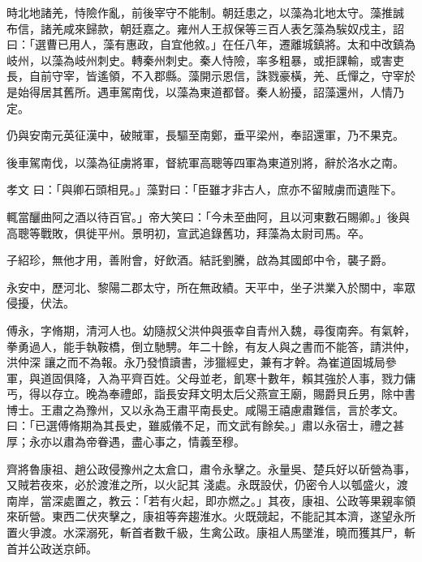 \begin{pinyinscope}
 時北地諸羌，恃險作亂，前後宰守不能制。朝廷患之，以藻為北地太守。藻推誠
 布信，諸羌咸來歸款，朝廷嘉之。雍州人王叔保等三百人表乞藻為騃奴戍主，詔曰：「選曹已用人，藻有惠政，自宜他敘。」在任八年，遷離城鎮將。太和中改鎮為岐州，以藻為岐州刺史。轉秦州刺史。秦人恃險，率多粗暴，或拒課輸，或害吏長，自前守宰，皆遙領，不入郡縣。藻開示恩信，誅戮豪橫，羌、氐憚之，守宰於是始得居其舊所。遇車駕南伐，以藻為東道都督。秦人紛擾，詔藻還州，人情乃定。



 仍與安南元英征漢中，破賊軍，長驅至南鄭，垂平梁州，奉詔還軍，乃不果克。



 後車駕南伐，以藻為征虜將軍，督統軍高聰等四軍為東道別將，辭於洛水之南。



 孝文
 曰：「與卿石頭相見。」藻對曰：「臣雖才非古人，庶亦不留賊虜而遺陛下。



 輒當釃曲阿之酒以待百官。」帝大笑曰：「今未至曲阿，且以河東數石賜卿。」後與高聰等戰敗，俱徙平州。景明初，宣武追錄舊功，拜藻為太尉司馬。卒。



 子紹珍，無他才用，善附會，好飲酒。結託劉騰，啟為其國郎中令，襲子爵。



 永安中，歷河北、黎陽二郡太守，所在無政績。天平中，坐子洪業入於關中，率眾侵擾，伏法。



 傅永，字脩期，清河人也。幼隨叔父洪仲與張幸自青州入魏，尋復南奔。有氣幹，拳勇過人，能手執鞍橋，倒立馳騁。年二十餘，有友人與之書而不能答，請洪仲，洪仲深
 讓之而不為報。永乃發憤讀書，涉獵經史，兼有才幹。為崔道固城局參軍，與道固俱降，入為平齊百姓。父母並老，飢寒十數年，賴其強於人事，戮力傭丐，得以存立。晚為奉禮郎，詣長安拜文明太后父燕宣王廟，賜爵貝丘男，除中書博士。王肅之為豫州，又以永為王肅平南長史。咸陽王禧慮肅難信，言於孝文。曰：「已選傅脩期為其長史，雖威儀不足，而文武有餘矣。」肅以永宿士，禮之甚厚；永亦以肅為帝眷遇，盡心事之，情義至穆。



 齊將魯康祖、趙公政侵豫州之太倉口，肅令永擊之。永量吳、楚兵好以斫營為事，又賊若夜來，必於渡淮之所，以火記其
 淺處。永既設伏，仍密令人以瓠盛火，渡南岸，當深處置之，教云：「若有火起，即亦燃之。」其夜，康祖、公政等果親率領來斫營。東西二伏夾擊之，康祖等奔趨淮水。火既競起，不能記其本濟，遂望永所置火爭渡。水深溺死，斬首者數千級，生禽公政。康祖人馬墜淮，曉而獲其尸，斬首并公政送京師。




\end{pinyinscope}

